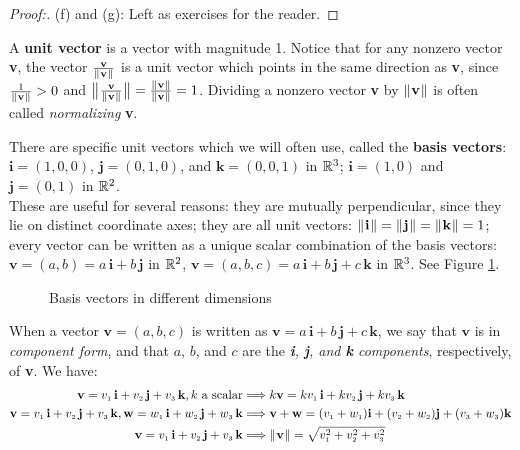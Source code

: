 \begin{proofbar}
\begin{proof}[Proof:]
 \par\noindent(f) and (g): Left as exercises for the reader.\vspace{-3mm}
\end{proof}\end{proofbar}

A \textbf{unit vector} is a vector with magnitude 1.
Notice that for any nonzero vector \textbf{v}, the vector $\frac{\textbf{v}}{\lVert\mspace{1mu}\textbf{v}\mspace{1mu}\rVert}$ is a unit vector which
points in the same direction as \textbf{v}, since $\frac{1}{\lVert\mspace{1mu}\textbf{v}\mspace{1mu}\rVert} > 0$ and
$\bigl\lVert\mspace{1mu}\frac{\textbf{v}}{\lVert\mspace{1mu}\textbf{v}\mspace{1mu}\rVert}\mspace{1mu}\bigr\rVert = \frac{\lVert\mspace{1mu}\textbf{v}\mspace{1mu}\rVert}{\lVert\mspace{1mu}\textbf{v}\mspace{1mu}\rVert} = 1$. Dividing a nonzero
vector \textbf{v} by $\lVert\mspace{1mu}\textbf{v}\mspace{1mu}\rVert$ is often called \emph{normalizing} \textbf{v}.

There are specific unit vectors which we will often use, called the \textbf{basis vectors}:\\
$\textbf{i} = (1,0,0)$, $\textbf{j} = (0,1,0)$, and $\textbf{k} = (0,0,1)$ in $\mathbb{R}^{3}$;
$\textbf{i} = (1,0)$ and $\textbf{j} = (0,1)$ in $\mathbb{R}^{2}$. \\These are useful for several reasons: they are mutually
perpendicular, since they lie on distinct coordinate axes; they are all unit vectors: $\lVert\mspace{1mu}\textbf{i}\mspace{1mu}\rVert =
\lVert\mspace{1mu}\textbf{j}\mspace{1mu}\rVert = \lVert\mspace{1mu}\textbf{k}\mspace{1mu}\rVert = 1$; every vector can be written as a unique scalar combination of the basis
vectors:
$\textbf{v} = (a,b) = a\,\textbf{i} + b\,\textbf{j}$ in $\mathbb{R}^{2}$, $\textbf{v} = (a,b,c) = a\,\textbf{i} +
b\,\textbf{j} + c\,\textbf{k}$ in $\mathbb{R}^{3}$. See Figure \ref{fig:basis}.

\begin{figure}[h]
 \centering
 \quad
 \quad
 \quad
 \caption[]{\quad Basis vectors in different dimensions}
 \label{fig:basis}
\end{figure}

When a vector $\textbf{v} = (a,b,c)$ is written as $\textbf{v} = a\,\textbf{i} + b\,\textbf{j} + c\,\textbf{k}$, we say
that $\textbf{v}$ is in \emph{component form}, and that $a$, $b$, and $c$ are the
\emph{\textbf{i}, \textbf{j}, and \textbf{k} components}, respectively, of \textbf{v}. We have:
\begin{align*}
 \textbf{v} = v_{\scriptscriptstyle 1}\,\textbf{i} + v_{\scriptscriptstyle 2}\,\textbf{j} + v_{\scriptscriptstyle 3}\,\textbf{k}, k \text{~a scalar} &\Longrightarrow k\textbf{v} = kv_{\scriptscriptstyle 1}\,\textbf{i} + kv_{\scriptscriptstyle 2}\,\textbf{j} + kv_{\scriptscriptstyle 3}\,\textbf{k}\\
 \textbf{v} = v_{\scriptscriptstyle 1}\,\textbf{i} + v_{\scriptscriptstyle 2}\,\textbf{j} + v_{\scriptscriptstyle 3}\,\textbf{k}, \textbf{w} = w_{\scriptscriptstyle 1}\,\textbf{i} + w_{\scriptscriptstyle 2}\,\textbf{j} + w_{\scriptscriptstyle 3}\,\textbf{k} &\Longrightarrow \textbf{v} + \textbf{w} =
 (v_{\scriptscriptstyle 1} + w_{\scriptscriptstyle 1})\textbf{i} + (v_{\scriptscriptstyle 2} + w_{\scriptscriptstyle 2})\textbf{j} + (v_{\scriptscriptstyle 3} + w_{\scriptscriptstyle 3})\textbf{k}\\
 \textbf{v} = v_{\scriptscriptstyle 1}\,\textbf{i} + v_{\scriptscriptstyle 2}\,\textbf{j} + v_{\scriptscriptstyle 3}\,\textbf{k} &\Longrightarrow \lVert\mspace{1mu}\textbf{v}\mspace{1mu}\rVert =
 \sqrt{v_{\scriptscriptstyle 1}^2 + v_{\scriptscriptstyle 2}^2 + v_{\scriptscriptstyle 3}^2}
\end{align*}

